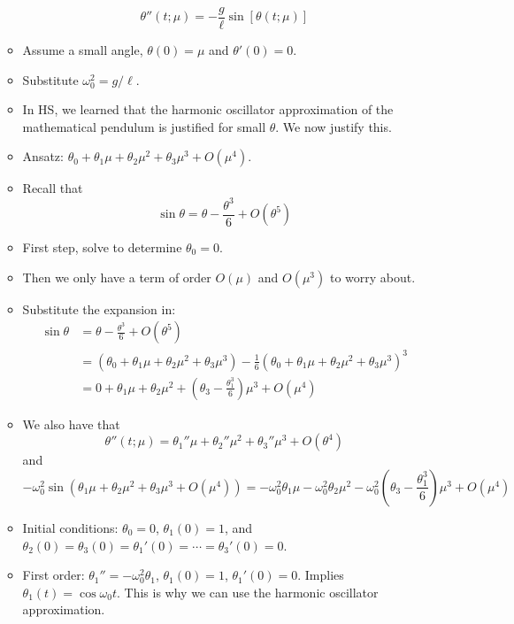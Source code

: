 \documentclass[../notes.tex]{subfiles}
\begin{document}
\begin{itemize}
\begin{itemize}
\begin{equation*}
            \theta''(t;\mu) = -\frac{g}{\ell}\sin[\theta(t;\mu)]
        \end{equation*}
        \item Assume a small angle, $\theta(0)=\mu$ and $\theta'(0)=0$.
        \item Substitute $\omega_0^2=g/\ell$.
        \item In HS, we learned that the harmonic oscillator approximation of the mathematical pendulum is justified for small $\theta$. We now justify this.
        \item Ansatz: $\theta_0+\theta_1\mu+\theta_2\mu^2+\theta_3\mu^3+O(\mu^4)$.
        \item Recall that
        \begin{equation*}
            \sin\theta = \theta-\frac{\theta^3}{6}+O(\theta^5)
        \end{equation*}
        \item First step, solve to determine $\theta_0=0$.
        \item Then we only have a term of order $O(\mu)$ and $O(\mu^3)$ to worry about.
        \item Substitute the expansion in:
        \begin{align*}
            \sin\theta &= \theta-\frac{\theta^3}{6}+O(\theta^5)\\
            &= \left( \theta_0+\theta_1\mu+\theta_2\mu^2+\theta_3\mu^3 \right)-\frac{1}{6}\left( \theta_0+\theta_1\mu+\theta_2\mu^2+\theta_3\mu^3 \right)^3\\
            &= 0+\theta_1\mu+\theta_2\mu^2+\left( \theta_3-\frac{\theta_1^3}{6} \right)\mu^3+O(\mu^4)
        \end{align*}
        \item We also have that
        \begin{equation*}
            \theta''(t;\mu) = \theta_1''\mu+\theta_2''\mu^2+\theta_3''\mu^3+O(\theta^4)
        \end{equation*}
        and
        \begin{equation*}
            -\omega_0^2\sin(\theta_1\mu+\theta_2\mu^2+\theta_3\mu^3+O(\mu^4)) = -\omega_0^2\theta_1\mu-\omega_0^2\theta_2\mu^2-\omega_0^2\left( \theta_3-\frac{\theta_1^3}{6} \right)\mu^3+O(\mu^4)
        \end{equation*}
        \item Initial conditions: $\theta_0=0$, $\theta_1(0)=1$, and $\theta_2(0) = \theta_3(0) = \theta_1'(0) = \cdots = \theta_3'(0) = 0$.
        \item First order: $\theta_1''=-\omega_0^2\theta_1$, $\theta_1(0)=1$, $\theta_1'(0)=0$. Implies $\theta_1(t)=\cos\omega_0t$. This is why we can use the harmonic oscillator approximation.

\end{itemize}
\end{itemize}
\end{document}
